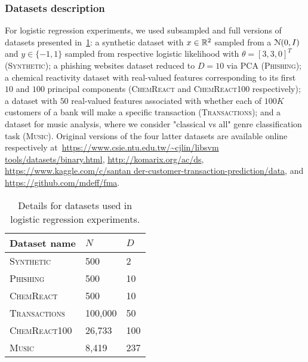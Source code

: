\subsubsection{Datasets description}
\label{supp:logreg_data_details}
For logistic regression experiments, we used subsampled and full versions of datasets presented in~\cref{table:datasets_details}: a synthetic dataset with $ x\in \mathbb{R}^2 $ sampled \iid from a $\mathcal{N}{(0, I)}$ and $ y\in\{-1,1\} $ sampled from respective logistic likelihood with $ \theta =[3, 3, 0]^T$ (\textsc{Synthetic}); a phishing websites dataset reduced to $ D=10 $ via PCA (\textsc{Phishing}); a chemical reactivity dataset with  real-valued features corresponding to its first $ 10 $ and $ 100 $ principal components (\textsc{ChemReact} and \textsc{ChemReact100} respectively); a dataset with $ 50 $ real-valued features associated with whether each of $ 100K $ customers of a bank will make a specific transaction (\textsc{Transactions}); and a dataset for music analysis, where we consider "classical vs all" genre classification task (\textsc{Music}). Original versions of the four latter datasets are available online respectively at~\href{https://www.csie.ntu.edu.tw/~cjlin/libsvmtools/datasets/binary.html}{https://www.csie.ntu.edu.tw/\~{}cjlin/libsvm tools/datasets/binary.html},  \href{http://komarix.org/ac/ds/}{http://komarix.org/ac/ds},  \href{https://www.kaggle.com/c/santander-customer-transaction-prediction/data}{https://www.kaggle.com/c/santan der-customer-transaction-prediction/data}, and \href{https://github.com/mdeff/fma}{https://github.com/mdeff/fma}. 

\begin{table}[!h]
	\begin{center}
		\begin{tabular}{|l|l|l|}
			\hline
			\textbf{Dataset name}       & $N$      & $D$   \\ \hline
			\textsc{Synthetic}  & 500    & 2   \\ \hline
			\textsc{Phishing}   & 500    & 10  \\ \hline
			\textsc{ChemReact}        & 500    & 10  \\ \hline
			\textsc{Transactions}  & 100,000   & 50   \\ \hline
			\textsc{ChemReact100}    & 26,733 & 100 \\ \hline
			\textsc{Music}      & 8,419    & 237 \\ \hline
		\end{tabular}
	\end{center}
	\caption{Details for datasets used in logistic regression experiments.}
	\label{table:datasets_details}
\end{table}

